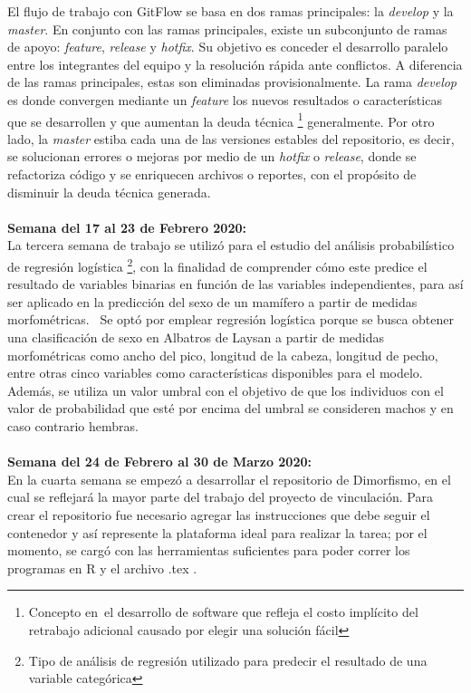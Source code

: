 \documentclass{article}
\begin{document}
     El flujo de trabajo con GitFlow se basa en dos ramas principales: la \textit{develop} y la \textit{master}. En conjunto con las ramas principales, existe un subconjunto de ramas de apoyo: \textit{feature}, \textit{release} y \textit{hotfix}. Su objetivo es conceder el desarrollo paralelo entre los integrantes del equipo y la resolución rápida ante conflictos. A diferencia de las ramas principales, estas son eliminadas provisionalmente.
    La rama \textit{develop} es donde convergen mediante un \textit{feature} los nuevos resultados o características que se desarrollen y que aumentan la deuda técnica \footnote{Concepto en el desarrollo de software que refleja el costo implícito del retrabajo adicional causado por elegir una solución fácil} generalmente. Por otro lado, la \textit{master} estiba cada una de las versiones estables del repositorio, es decir, se solucionan errores o mejoras por medio de un \textit{hotfix} o \textit{release}, donde se refactoriza código y se enriquecen archivos o reportes, con el propósito de disminuir la deuda técnica generada. 
    \\ \\ 
    \textbf{Semana del 17 al 23 de Febrero 2020:} \\
   La tercera semana de trabajo se utilizó para el estudio del análisis probabilístico de regresión logística \footnote{Tipo de análisis de regresión utilizado para predecir el resultado de una variable categórica}, con la finalidad de comprender cómo este predice el resultado de variables binarias en función de las variables independientes, para así ser aplicado en la predicción del sexo de un mamífero a partir de medidas morfométricas. 
    Se optó por emplear regresión logística porque se busca obtener una clasificación de sexo en Albatros de Laysan a partir de medidas morfométricas como ancho del pico, longitud de la cabeza, longitud de pecho, entre otras cinco variables como características disponibles para el modelo. Además, se utiliza un valor umbral con el objetivo de que los individuos con el valor de probabilidad que esté por encima del umbral se consideren machos y en caso contrario hembras.
\\ \\
    \textbf{Semana del 24 de Febrero al 30 de Marzo 2020:} \\
    En la cuarta semana se empezó a desarrollar el repositorio de Dimorfismo, en el cual se reflejará la mayor parte del trabajo del proyecto de vinculación. Para crear el repositorio fue necesario agregar las instrucciones que debe seguir el contenedor y así represente la plataforma ideal para realizar la tarea; por el momento, se cargó con las herramientas suficientes para poder correr los programas en R y el archivo .tex .
\end{document}
